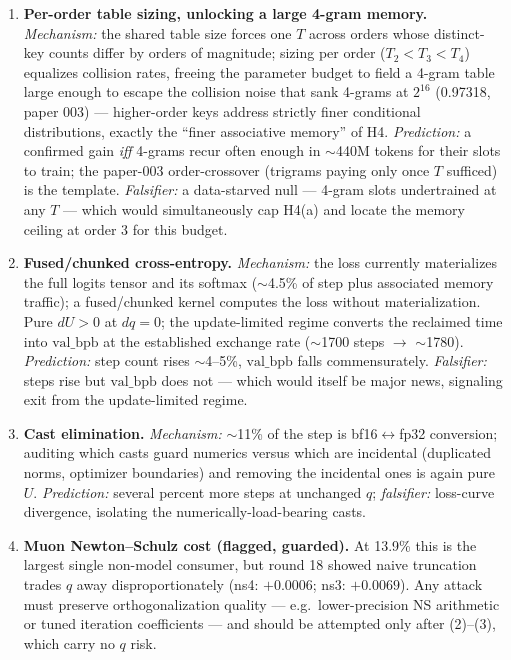 \documentclass{article}
\newcommand{\valbpb}{\mathrm{val\_bpb}}
\begin{document}
\begin{enumerate}
    \item \textbf{Per-order table sizing, unlocking a large 4-gram memory.} \emph{Mechanism:} the shared table size forces one $T$ across orders whose distinct-key counts differ by orders of magnitude; sizing per order ($T_2 < T_3 < T_4$) equalizes collision rates, freeing the parameter budget to field a 4-gram table large enough to escape the collision noise that sank 4-grams at $2^{16}$ (0.97318, paper 003) --- higher-order keys address strictly finer conditional distributions, exactly the ``finer associative memory'' of H4. \emph{Prediction:} a confirmed gain \emph{iff} 4-grams recur often enough in $\sim$440M tokens for their slots to train; the paper-003 order-crossover (trigrams paying only once $T$ sufficed) is the template. \emph{Falsifier:} a data-starved null --- 4-gram slots undertrained at any $T$ --- which would simultaneously cap H4(a) and locate the memory ceiling at order 3 for this budget.
    \item \textbf{Fused/chunked cross-entropy.} \emph{Mechanism:} the loss currently materializes the full logits tensor and its softmax ($\sim$4.5\% of step plus associated memory traffic); a fused/chunked kernel \cite{hsu2024liger} computes the loss without materialization. Pure $dU > 0$ at $dq = 0$; the update-limited regime converts the reclaimed time into $\valbpb$ at the established exchange rate ($\sim$1700 steps $\rightarrow$ $\sim$1780). \emph{Prediction:} step count rises $\sim$4--5\%, $\valbpb$ falls commensurately. \emph{Falsifier:} steps rise but $\valbpb$ does not --- which would itself be major news, signaling exit from the update-limited regime.
    \item \textbf{Cast elimination.} \emph{Mechanism:} $\sim$11\% of the step is bf16$\leftrightarrow$fp32 conversion; auditing which casts guard numerics versus which are incidental (duplicated norms, optimizer boundaries) and removing the incidental ones is again pure $U$. \emph{Prediction:} several percent more steps at unchanged $q$; \emph{falsifier:} loss-curve divergence, isolating the numerically-load-bearing casts.
    \item \textbf{Muon Newton--Schulz cost (flagged, guarded).} At 13.9\% this is the largest single non-model consumer, but round 18 showed naive truncation trades $q$ away disproportionately (ns4: $+0.0006$; ns3: $+0.0069$). Any attack must preserve orthogonalization quality --- e.g.\ lower-precision NS arithmetic or tuned iteration coefficients --- and should be attempted only after (2)--(3), which carry no $q$ risk.
\end{enumerate}
\end{document}
